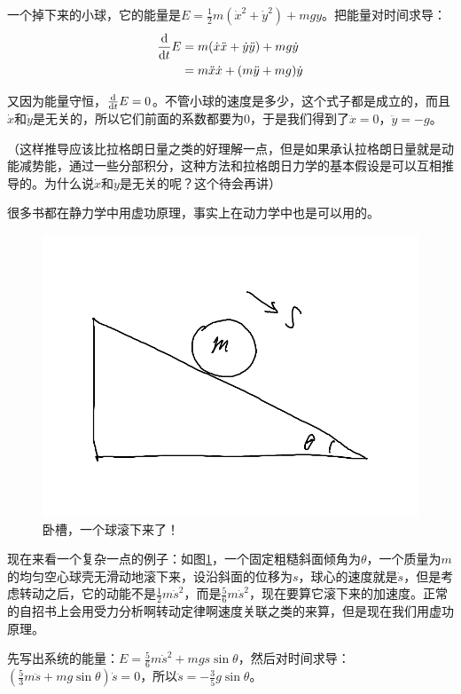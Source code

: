 一个掉下来的小球，它的能量是$E=\frac{1}{2}m(\dot x^2+\dot y^2)+m g y$。把能量对时间求导：
\begin{align*}
\frac{\mathop{}\!\mathrm{d}}{\mathop{}\!\mathrm{d} t} E&=m(\dot x \ddot x+\dot y \ddot y)+m g \dot y \\
&=m \ddot x \dot x+(m \ddot y+m g) \dot y
\end{align*}

又因为能量守恒，$\frac{\mathop{}\!\mathrm{d}}{\mathop{}\!\mathrm{d} t} E=0$。不管小球的速度是多少，这个式子都是成立的，而且$\dot x$和$\dot y$是无关的，所以它们前面的系数都要为$0$，于是我们得到了$\ddot x=0$，$\ddot y=-g$。

（这样推导应该比拉格朗日量之类的好理解一点，但是如果承认拉格朗日量就是动能减势能，通过一些分部积分，这种方法和拉格朗日力学的基本假设是可以互相推导的。为什么说$\dot x$和$\dot y$是无关的呢？这个待会再讲）

很多书都在静力学中用虚功原理，事实上在动力学中也是可以用的。
\begin{figure}[htb]
\centering
\includegraphics[scale=0.5]{fig/slope-ball.png}
\caption{卧槽，一个球滚下来了！}
\label{fig-slope-ball}
\end{figure}

现在来看一个复杂一点的例子：如图\ref{fig-slope-ball}，一个固定粗糙斜面倾角为$\theta$，一个质量为$m$的均匀空心球壳无滑动地滚下来，设沿斜面的位移为$s$，球心的速度就是$\dot s$，但是考虑转动之后，它的动能不是$\frac{1}{2} m \dot s^2$，而是$\frac{5}{6} m \dot s^2$，现在要算它滚下来的加速度。正常的自招书上会用受力分析啊转动定律啊速度关联之类的来算，但是现在我们用虚功原理。

先写出系统的能量：$E=\frac{5}{6} m \dot s^2+m g s \sin \theta$，然后对时间求导：$(\frac{5}{3} m \ddot s+m g \sin \theta) \dot s=0$，所以$\ddot s=-\frac{3}{5} g \sin \theta$。

